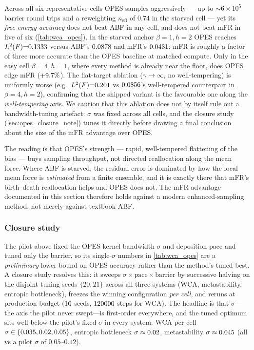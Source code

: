 Across all six representative cells OPES samples aggressively --- up to
$\sim\!6\times10^{5}$ barrier round trips and a reweighting $n_{\mathrm{eff}}$ of
$0.74$ in the starved cell --- yet its \emph{free-energy accuracy} does not beat
ABF in any cell, and does not beat mFR in five of six (\cref{tab:wca_opes}). In the
starved anchor $\beta{=}1,h{=}2$ OPES reaches $L^2(F){=}0.1333$
versus ABF's $0.0878$ and mFR's $0.0431$; mFR is roughly a
factor of three more accurate than the OPES baseline at matched compute. Only in
the easy cell $\beta{=}4,h{=}1$, where every method is already near the floor, does
OPES edge mFR ($+9.7\%$). The flat-target ablation
($\gamma{\to}\infty$, no well-tempering) is uniformly worse (e.g.\
$L^2(F){=}0.201$ vs $0.0856$'s well-tempered counterpart in
$\beta{=}4,h{=}2$), confirming that the shipped variant is the favourable one along
the \emph{well-tempering} axis. We caution that this ablation does not by itself rule
out a bandwidth-tuning artefact: $\sigma$ was fixed across all cells, and the closure
study (\cref{sec:opes_closure_note}) tunes it directly before drawing a final
conclusion about the size of the mFR advantage over OPES.



The reading is that OPES's strength --- rapid, well-tempered flattening of the bias
--- buys sampling throughput, not directed reallocation along the mean force.
Where ABF is starved, the residual error is dominated by how the local mean force is
\emph{estimated} from a finite ensemble, and it is exactly there that mFR's
birth--death reallocation helps and OPES does not. The mFR advantage documented in
this section therefore holds against a modern enhanced-sampling method, not merely
against textbook ABF.

\subsubsection*{Closure study}
\label{sec:opes_closure_note}
The pilot above fixed the OPES kernel bandwidth $\sigma$ and deposition pace and
tuned only the barrier, so its single-$\sigma$ numbers in \cref{tab:wca_opes} are a
\emph{preliminary} lower bound on OPES accuracy rather than the method's tuned best.
A closure study resolves this: it sweeps $\sigma\times\text{pace}\times\text{barrier}$
by successive halving on the disjoint tuning seeds $\{20,21\}$ across all three
systems (WCA, metastability, entropic bottleneck), freezes the winning configuration
\emph{per cell}, and reruns at production budget ($10$ seeds,
$120000$ steps for WCA). The headline is that $\sigma$---the axis the pilot
never swept---is first-order everywhere, and the tuned optimum sits well below the
pilot's fixed $\sigma$ in every system: WCA per-cell $\sigma\in\{0.035,
0.02, 0.05\}$, entropic bottleneck $\sigma\approx
0.02$, metastability $\sigma\approx0.045$ (all vs a
pilot $\sigma$ of $0.05$--$0.12$).

